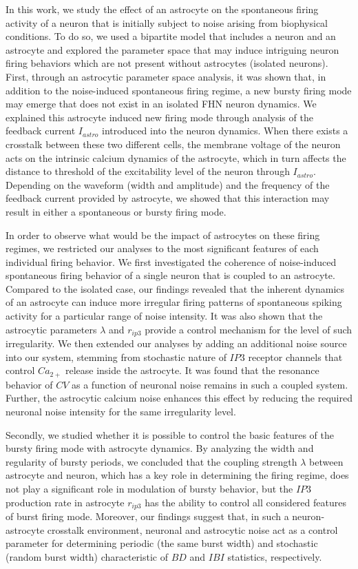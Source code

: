 \documentclass[%
 aip,
 amsmath,amssymb,
 reprint,%
]{revtex4-1}
\begin{document}
	In this work, we study the effect of an astrocyte on the spontaneous firing activity of a neuron that is initially subject to noise arising from biophysical conditions. To do so, we used a bipartite model that includes a neuron and an astrocyte and explored the parameter space that may induce intriguing neuron firing behaviors which are not present without astrocytes (isolated neurons). First, through an astrocytic parameter space analysis, it was shown that, in addition to the noise-induced spontaneous firing regime, a new bursty firing mode may emerge that does not exist in an isolated FHN neuron dynamics. We explained this astrocyte induced new firing mode through analysis of the feedback current $I_{astro}$ introduced into the neuron dynamics. When there exists a crosstalk between these two different cells, the  membrane voltage of the neuron acts on the intrinsic calcium dynamics of the astrocyte, which in turn affects the distance to threshold of the excitability level of the neuron through $I_{astro}$. Depending on the waveform (width and amplitude) and the frequency of the feedback current provided by astrocyte, we showed that this interaction may result in either a spontaneous or bursty firing mode. 
	
	In order to observe what would be the impact of astrocytes on these firing regimes, we restricted our analyses to the most significant features of each individual firing behavior. We first investigated the coherence of noise-induced spontaneous firing behavior of a single neuron that is coupled to an astrocyte. Compared to the isolated case, our findings revealed that the inherent dynamics of an astrocyte can induce more irregular firing patterns of spontaneous spiking activity for a particular range of noise intensity. It was also shown that the astrocytic parameters $\lambda$ and $r_{ip3}$ provide a control mechanism for the level of such irregularity. We then extended our analyses by adding an additional noise source into our system, stemming from stochastic nature of $IP3$ receptor channels that control $Ca_{2+}$ release inside the astrocyte. It was found that the resonance behavior of $CV$ as a function of neuronal noise remains in such a coupled system.  Further, the astrocytic calcium noise enhances this effect by reducing  the required neuronal noise intensity for the same irregularity level.

	 Secondly, we studied whether it is possible to control the basic features of the bursty firing mode with astrocyte dynamics. By analyzing the width and regularity of bursty periods, we concluded that the coupling strength $\lambda$ between astrocyte and neuron, which has a key role in determining the firing regime, does not play a significant role in modulation of bursty behavior, but the $IP3$ production rate in astrocyte $r_{ip3}$ has the ability to control all considered features of burst firing mode.  Moreover, our findings suggest that, in such a neuron-astrocyte crosstalk environment,  neuronal and astrocytic noise act as a control parameter for determining periodic (the same burst width) and stochastic (random burst width) characteristic of $BD$ and $IBI$ statistics, respectively. 
\end{document}
